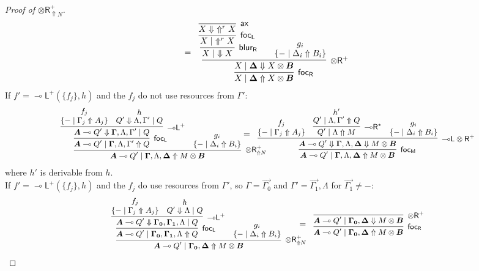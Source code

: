 \documentclass[runningheads]{llncs}
\newcommand{\tr}{\otimes \mathsf{R}}
\newcommand{\lright}{{\multimap}\mathsf{R}}
\newcommand{\lleft}{{\multimap}\mathsf{L}}
\newcommand{\otR}{\tr}
\newcommand{\lolliR}{\lright}
\newcommand{\lolliL}{\lleft}
\newcommand{\ax}{\mathsf{ax}}
\newcommand{\ot}{\otimes}
\newcommand{\lolli}{\multimap}
\newcommand{\proofbox}[1]{\begin{tabular}{l} #1 \end{tabular}}
\newcommand{\up}{\Uparrow}
\newcommand{\dn}{\Downarrow}
\newcommand{\focL}{\mathsf{foc_L}}
\newcommand{\focR}{\mathsf{foc_R}}
\newcommand{\blurR}{\mathsf{blur_R}}
\newcommand{\focLR}{\mathsf{foc_{M}}}
\begin{document}
\begin{proof}[Proof of $\tr_{\up N}^+$]
\[{{     }
   }
   =
   \proofbox{
     \infer[\focR]{X \mid \vec{\Delta} \up X \ot \vec{B}}{
       \infer[\otR^+]{X \mid \vec{\Delta} \dn X \ot \vec{B}}{
         \infer[\blurR]{X \mid ~ \dn X}{
           \infer[\focL]{X \mid ~ \up^r X}{
             \infer[\ax]{X \dn ~ \up^r X}{}
           }
         } &
     &
     \deduce{\{ - \mid \Delta_i \up B_i\}}{g_i}          
       }
     }
   }
   \]
    If $f' = \lolliL^+(\{f_j\},h)$ and the $f_j$ do not use resources from $\Gamma'$:
    \[\footnotesize
    \proofbox{
      \infer[\tr_{\up N}^+]{\vec{A} \lolli Q' \mid \vec{\Gamma},\Lambda,\vec{\Delta} \up M \ot \vec{B}}{
        \infer[\focL]{\vec{A} \lolli Q' \mid \vec{\Gamma},\Lambda,\Gamma' \up Q}{
          \infer[\lolliL^+]{\vec{A} \lolli Q' \dn \vec{\Gamma},\Lambda,\Gamma' \mid Q}{
          \deduce{\{ - \mid \Gamma_j \up A_j\}}{f_j}
          &
          \deduce{Q' \dn \Lambda,\Gamma' \mid Q}{h}
          }
        }
      &
      \deduce{\{ - \mid \Delta_i \up B_i\}}{g_i}
      }
    }
    \hspace{-1.257 cm}
    =
    \proofbox{
      \infer[\focLR]{\vec{A} \lolli Q' \mid \vec{\Gamma},\Lambda,\vec{\Delta} \up M \ot \vec{B}}{
        \infer[\lolliL\otR^+]{\vec{A} \lolli Q' \dn \vec{\Gamma}, \Lambda, \vec{\Delta} \dn M \ot \vec{B}}{
          \deduce{\{ - \mid \Gamma_j \up A_j\}}{f_j}
          &
          \infer[\lolliR^{\star}]{Q' \mid \Lambda \up M}{
            \deduce{Q' \mid \Lambda,\Gamma' \up Q}{h'}
          }
          &
          \deduce{\{ - \mid \Delta_i \up B_i\}}{g_i}
        }
      }
    }
    \]
    where $h'$ is derivable from $h$.
    \\If $f' = \lolliL^+(\{f_j\},h)$ and the $f_j$ do use resources from $\Gamma'$, so $\Gamma = \vec{\Gamma_0}$ and $\Gamma' = \vec{\Gamma_1},\Lambda$ for $\vec{\Gamma_1} \not= -$:
    \[\footnotesize
    \proofbox{
      \infer[\tr_{\up N}^+]{\vec{A} \lolli Q' \mid \vec{\Gamma_0},\vec{\Delta} \up M \ot \vec{B}}{
        \infer[\focL]{\vec{A} \lolli Q' \mid \vec{\Gamma_0},\vec{\Gamma_1},\Lambda \up Q}{
          \infer[\lolliL^+]{\vec{A} \lolli Q' \dn \vec{\Gamma_0},\vec{\Gamma_1},\Lambda \mid Q}{
          \deduce{\{ - \mid \Gamma_j \up A_j\}}{f_j}
          &
          \deduce{Q' \dn \Lambda \mid Q}{h}
          }
        }
      &
      \deduce{\{ - \mid \Delta_i \up B_i\}}{g_i}
      }
    }
    \hspace{-.6cm}
    =
   \proofbox{
     \infer[\focR]{\vec{A} \lolli Q' \mid \vec{\Gamma_0},\vec{\Delta} \up M \ot \vec{B}}{
       \infer[\otR^+]{\vec{A} \lolli Q' \mid \vec{\Gamma_0},\vec{\Delta} \dn M \ot \vec{B}}{
}}}\]
\end{proof}
\end{document}
